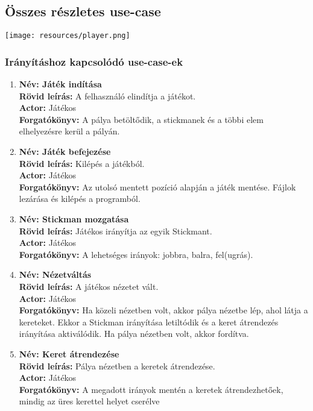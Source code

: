 	\subsection{Összes részletes use-case}
        \newcommand{\ucitem}[1]{\item \textbf{Név: #1}\\}
        \newcommand{\ucdesc}[1]{\textbf{Rövid leírás: } #1\\}
        \newcommand{\ucact}[1]{\textbf{Actor: } #1\\}
        \newcommand{\ucscenario}[1]{\textbf{Forgatókönyv: }#1\\}
        
		\begin{center}	
		    \texttt{[image: resources/player.png]}
		\end{center}        
        
        \subsubsection{Irányításhoz kapcsolódó use-case-ek} 
		
	    \begin{enumerate}[label=\textbf{\arabic*.}, start=1]
	        \ucitem{Játék indítása} 
	        \ucdesc{A felhasználó elindítja a játékot.} 
	        \ucact{Játékos}
	        \ucscenario{A pálya betöltődik, a stickmanek és a többi elem elhelyezésre kerül a pályán.} 

		
	        \ucitem{Játék befejezése} 
	        \ucdesc{Kilépés a játékból.} 
	        \ucact{Játékos}
	        \ucscenario{Az utolsó mentett pozíció alapján a játék mentése. Fájlok lezárása és kilépés a programból.} 
	        
	        \ucitem{Stickman mozgatása} 
	        \ucdesc{Játékos irányítja az egyik Stickmant.} 
	        \ucact{Játékos}
	        \ucscenario{A lehetséges irányok: jobbra, balra, fel(ugrás).}
		
	        \ucitem{Nézetváltás} 
	        \ucdesc{A játékos nézetet vált.} 
	        \ucact{Játékos}
	        \ucscenario{Ha közeli nézetben volt, akkor pálya nézetbe lép, ahol látja a kereteket. Ekkor a Stickman irányítása letiltódik és a keret átrendezés irányítása aktiválódik. Ha pálya nézetben volt, akkor fordítva.} 
	        
	        \ucitem{Keret átrendezése} 
	        \ucdesc{Pálya nézetben a keretek átrendezése.} 
	        \ucact{Játékos}
	        \ucscenario{A megadott irányok mentén a keretek átrendezhetőek, mindig az üres kerettel helyet cserélve} 
	    \end{enumerate}
	    
